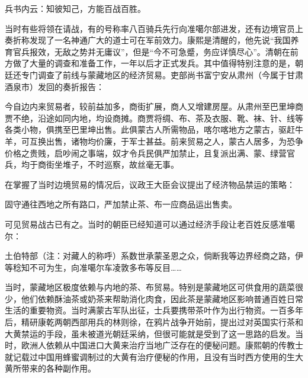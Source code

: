 
\begin{bookquote}兵书内云：知彼知己，方能百战百胜。\end{bookquote}


当时有些将领在请战，有的号称率八百骑兵先行向准噶尔部进发，还有边境官员上奏折称发现了一名神通广大的道士可在军前效力。康熙是清醒的，他先说“我国养育官兵报效，无敌之势并无庸议”，但是“今不可急蹙，务应详慎尽心”。清朝在前方做了大量的调查和准备工作，一年以后才正式发兵。其中值得特别注意的是，朝廷还专门调查了前线与蒙藏地区的经济贸易。吏部尚书富宁安从肃州（今属于甘肃酒泉市）发回的奏折报告：



\begin{bookquote}今自边内来贸易者，较前益加多，商街扩展，商人又增建房屋。从肃州至巴里坤商贾不绝，沿途如同内地，均设商摊。商贾将绸、布、茶及衣服、靴、袜、针、线等各类小物，俱携至巴里坤出售。此俱蒙古人所需物品，喀尔喀地方之蒙古，驱赶牛羊，可互换出售，诸物均价廉，于军士甚益。前来贸易之人，蒙古人居多，为恐争价格之贵贱，启吵闹之事端，奴才令兵民俱严加禁止，且复派出满、蒙、绿营官兵，均于商街坐堆子，不时巡察，故丝毫无事。\end{bookquote}


在掌握了当时边境贸易的情况后，议政王大臣会议提出了经济物品禁运的策略：



\begin{bookquote}固守通往西地之所有路口，严加禁止茶、布一应商品运出售卖。\end{bookquote}


可见贸易战古已有之。当时的朝臣已经知道可以通过经济手段让老百姓反感准噶尔：



\begin{bookquote}土伯特部（注：对藏人的称呼）系数世承蒙圣恩之众，倘断我等边界经商之路，伊等稔知不可为生，向准噶尔车凌敦多布等反目……\end{bookquote}


当时，蒙藏地区极度依赖与内地的茶、布贸易。特别是蒙藏地区可供食用的蔬菜很少，他们依赖酥油茶或奶茶来帮助消化肉食，因此茶是蒙藏地区影响普通百姓日常生活的重要物资。当时满蒙古军队出征，士兵要携带茶叶作为出行物资。一百多年后，精研康乾两朝西部用兵的林则徐，在鸦片战争开始前，提出过对英国实行茶和大黄禁运的手段，虽未被道光朝廷采纳，但很可能就是受到了这一思路的启发。当时，欧洲人依赖从中国进口大黄来治疗当地广泛存在的便秘问题。康熙朝的传教士就记载过中国用蜂蜜调制过的大黄有治疗便秘的作用，且没有当时西方使用的生大黄所带来的各种副作用。


